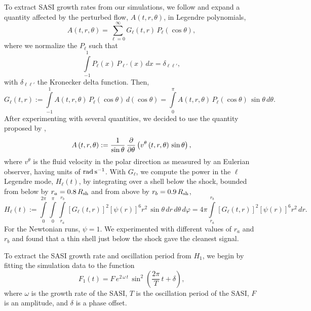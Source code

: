 To extract SASI growth rates from our simulations,
we follow \citet{bm2006} and expand a quantity
affected by the perturbed flow,
$A\left(t,r,\theta\right)$, in Legendre polynomials,
\begin{equation}
  A\left(t,r,\theta\right)
  =\sum\limits_{\ell=0}^{\infty}
  G_{\ell}\left(t,r\right)\,P_{\ell}\left(\cos\theta\right),
\end{equation}
where we normalize the $P_{\ell}$ such that
\begin{equation}
  \int\limits_{-1}^{1}P_{\ell}\left(x\right)\,P_{\ell'}\left(x\right)\,dx
  =\delta_{\ell\ell'},
\end{equation}
with $\delta_{\ell\ell'}$ the Kronecker delta function.
Then,
\begin{equation}
  G_{\ell}\left(t,r\right):=
  \int\limits_{-1}^{1}A\left(t,r,\theta\right)\,
  P_{\ell}\left(\cos\theta\right)\,d\left(\cos\theta\right)
  =\int\limits_{0}^{\pi}
  A\left(t,r,\theta\right)\,P_{\ell}\left(\cos\theta\right)\,
  \sin\theta\,d\theta.
\end{equation}
After experimenting with several quantities,
we decided to use the quantity proposed by \citet{sjf2008},
\begin{equation}
  A\left(t,r,\theta\right)
  :=\frac{1}{\sin\theta}\,\frac{\partial}{\partial\theta}
  \left(v^{\theta}\left(t,r,\theta\right)\,\sin\theta\right),
\end{equation}
where $v^{\theta}$ is the fluid velocity in the polar direction
as measured by an Eulerian observer,
having units of $\mathrm{rad}\,\mathrm{s}^{-1}$.
With $G_{\ell}$, we compute the power in the $\ell$\th{} Legendre mode,
$H_{\ell}\left(t\right)$, by integrating over a shell below the shock,
bounded from below by $r_{a}=0.8\,R_{\mathrm{sh}}$ and from above
by $r_{b}=0.9\,R_{\mathrm{sh}}$,
\begin{equation}
  H_{\ell}\left(t\right):=
  \int\limits_{0}^{2\pi}\int\limits_{0}^{\pi}
  \int\limits_{r_{a}}^{r_{b}}
  \left[G_{\ell}\left(t,r\right)\right]^{2}
  \left[\psi\left(r\right)\right]^{6}r^{2}\,\sin\theta\,dr\,d\theta\,d\varphi
  =4\pi\int\limits_{r_{a}}^{r_{b}}
  \left[G_{\ell}\left(t,r\right)\right]^{2}
  \left[\psi\left(r\right)\right]^{6}r^{2}\,dr.
\end{equation}
For the Newtonian runs, $\psi=1$.
We experimented with different values of $r_{a}$ and $r_{b}$
and found that a thin shell just below the shock gave the cleanest signal.

To extract the SASI growth rate and oscillation period from $H_{1}$,
we begin by fitting the simulation data to the function \citep{bm2006}
\begin{equation}
  F_{1}\left(t\right)
  =F\,e^{2\,\omega\,t}\,
  \sin^{2}\left(\frac{2\pi}{T}\,t+\delta\right),
  \label{eq.H1Fit}
\end{equation}
where $\omega$ is the growth rate of the SASI, $T$ is the
oscillation period of the SASI,
$F$ is an amplitude, and $\delta$ is a phase offset.

